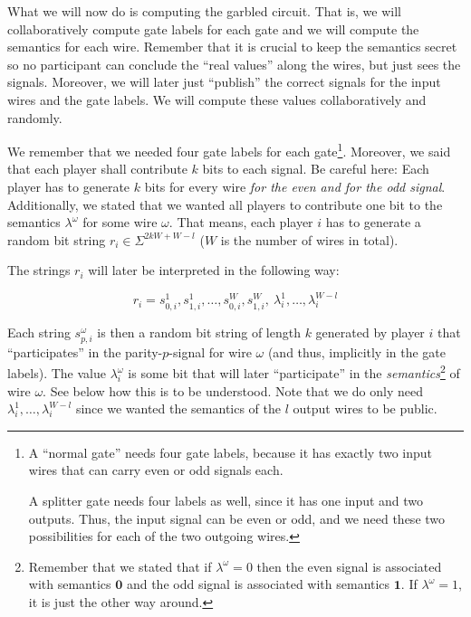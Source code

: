 \message{ !name(seminar.tex)}\documentclass{llncs}
\begin{document}
What we will now do is computing the garbled circuit. That is, we will collaboratively compute gate labels for each gate and we will compute the semantics for each wire. Remember that it is crucial to keep the semantics secret so no participant can conclude the ``real values'' along the wires, but just sees the signals. Moreover, we will later just ``publish'' the correct signals for the input wires and the gate labels. We will compute these values collaboratively and randomly.

We remember that we needed four gate labels for each gate\footnote{A ``normal gate'' needs four gate labels, because it has exactly two input wires that can carry even or odd signals each. 

A splitter gate needs four labels as well, since it has one input and two outputs. Thus, the input signal can be even or odd, and we need these two possibilities for each of the two outgoing wires.}. Moreover, we said that each player shall contribute $k$ bits to each signal. Be careful here: Each player has to generate $k$ bits for every wire \emph{for the even and for the odd signal}. Additionally, we stated that we wanted all players to contribute one bit to the semantics $\lambda^\omega$ for some wire $\omega$. That means, each player $i$ has to generate a random bit string $r_i\in\Sigma^{2kW+W-l}$ ($W$ is the number of wires in total).

The strings $r_i$ will later be interpreted in the following way:

\begin{equation}
  \label{eq:interpretation-random-string-of-a-player}
  r_i=s_{0,i}^1,s_{1,i}^1,\dots,s_{0,i}^W,s_{1,i}^W,\  \lambda_i^1,\dots,\lambda_i^{W-l}
\end{equation}

Each string $s^\omega_{p,i}$ is then a random bit string of length $k$ generated by player $i$ that ``participates'' in the parity-$p$-signal for wire $\omega$ (and thus, implicitly in the gate labels). The value $\lambda_i^\omega$ is some bit that will later ``participate'' in the \emph{semantics}\footnote{Remember that we stated that if $\lambda^\omega=0$ then the even signal is associated with semantics $\mathbf{0}$ and the odd signal is associated with semantics $\mathbf{1}$. If $\lambda^\omega=1$, it is just the other way around.} of wire $\omega$. See below how this is to be understood. Note that we do only need $\lambda_i^1,\dots,\lambda_i^{W-l}$ since we wanted the semantics of the $l$ output wires to be public.
\end{document}
